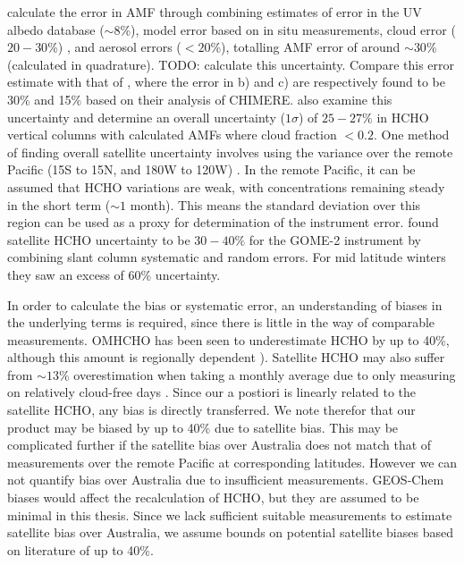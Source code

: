     \textcite{Palmer2006} calculate the error in AMF through combining estimates of error in the UV albedo database ($\sim 8$\%), model error based on in situ measurements, cloud error  ($20-30$\%) \parencite{Martin2003}, and aerosol errors ($<20$\%), totalling AMF error of around $\sim 30$\% (calculated in quadrature).
    TODO: calculate this uncertainty.
    Compare this error estimate with that of \textcite{Curci2010}, where the error in b) and c) are respectively found to be 30\% and 15\% based on their analysis of CHIMERE.
    \textcite{Millet2008} also examine this uncertainty and determine an overall uncertainty ($1\sigma$) of $25-27\%$ in HCHO vertical columns with calculated AMFs where cloud fraction $< 0.2$.
    One method of finding overall satellite uncertainty involves using the variance over the remote Pacific (15\degr S to 15\degr N, and 180\degr W to 120\degr W) \parencite[][]{DeSmedt2012,DeSmedt2015}.
    In the remote Pacific, it can be assumed that HCHO variations are weak, with concentrations remaining steady in the short term ($\sim 1$ month).
    This means the standard deviation over this region can be used as a proxy for determination of the instrument error.
    \textcite{DeSmedt2012} found satellite HCHO uncertainty to be $30-40\%$ for the GOME-2 instrument by combining slant column systematic and random errors.
    For mid latitude winters they saw an excess of 60\% uncertainty.
    
    In order to calculate the bias or systematic error, an understanding of biases in the underlying terms is required, since there is little in the way of comparable measurements.
    OMHCHO has been seen to underestimate HCHO by up to 40\%, although this amount is regionally dependent \parencite{Zhu2016,DeSmedt2015,Barkley2013}).
    Satellite HCHO may also suffer from $\sim13\%$ overestimation when taking a monthly average due to only measuring on relatively cloud-free days \parencite{Surl2018}.
    Since our a postiori is linearly related to the satellite HCHO, any bias is directly transferred.
    We note therefor that our product may be biased by up to 40\% due to satellite bias.
    This may be complicated further if the satellite bias over Australia does not match that of measurements over the remote Pacific at corresponding latitudes.
    However we can not quantify bias over Australia due to insufficient measurements.
    GEOS-Chem biases would affect the recalculation of HCHO, but they are assumed to be minimal in this thesis.
    Since we lack sufficient suitable measurements to estimate satellite bias over Australia, we assume bounds on potential satellite biases based on literature of up to 40\%.
    
